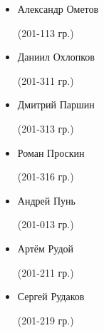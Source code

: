 \begin{multicols}{2}
\begin{small}
\begin{itemize}[leftmargin=*]
	\item[] Александр Ометов\begin{tiny} (201-113 гр.)\end{tiny} %
	\item[] Даниил Охлопков\begin{tiny} (201-311 гр.)\end{tiny}

	\item[] Дмитрий Паршин\begin{tiny} (201-313 гр.)\end{tiny} %
	\item[] Роман Проскин\begin{tiny} (201-316 гр.)\end{tiny} %
	\item[] Андрей Пунь\begin{tiny} (201-013 гр.)\end{tiny}

	\item[] Артём Рудой\begin{tiny} (201-211 гр.)\end{tiny}
	\item[] Сергей Рудаков\begin{tiny} (201-219 гр.)\end{tiny} %


\end{itemize}
\end{small}
\end{multicols}

